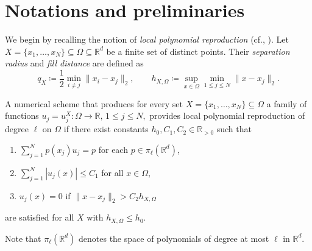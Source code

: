 \documentclass{drna}
\begin{document}
\section{Notations and preliminaries}
\label{sec_preliminaries}
We begin by recalling the notion of {\it local polynomial reproduction} (cf., \cite[Definition 3.1]{wendland_2004}). Let $X=\{x_1,\dots,x_N\} \subseteq \Omega\subseteq \mathbb{R}^d$ be a finite set of distinct points. Their {\it separation radius} and {\it fill distance} are defined as
\begin{equation*}
    q_{X} \coloneqq \frac{1}{2} \min_{i \neq j} \|x_i-x_j\|_2, \qquad h_{X,\Omega} \coloneqq \sup_{x \in \Omega} \min_{1 \leq j \leq N} \|x-x_j\|_{2}.
\end{equation*}
\begin{definition}\label{def_local_app_procc}
A numerical scheme that produces for every set $X=\{ x_1, \dots, x_N\} \subseteq \Omega$ a family of functions $u_j = u_j^X : \Omega \rightarrow \mathbb{R}, \, 1 \leq j \leq N,$ provides local polynomial reproduction of degree $\ell$ on $\Omega$ if there exist constants $h_0, C_1, C_2 \in \mathbb{R}_{>0}$ such that
	\begin{enumerate}
		\item $\displaystyle \sum_{j=1}^{N} p(x_j)u_j = p$ for each $p \in \pi_{\ell}(\mathbb{R}^d)$,
		\item $\displaystyle \sum_{j=1}^{N} |u_j(x)| \leq C_1$ for all $x \in \Omega$,
		\item $u_j(x)=0$ if $\|x-x_j\|_2 > C_2 h_{X,\Omega}$
	\end{enumerate}
are satisfied for all $X$ with $h_{X,\Omega} \leq h_0$. 
\end{definition}

\noindent
Note that  $\pi_{\ell}(\mathbb{R}^d)$ denotes the space of polynomials of degree at most $\ell$ in $\mathbb{R}^d$.
\end{document}
